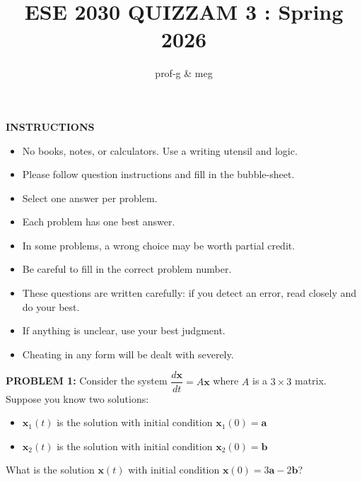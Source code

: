 \documentclass[12pt]{amsart}
\title{ESE 2030 QUIZZAM 3 : Spring 2026}
\author{prof-g \& meg}
\begin{document}
\maketitle

\begin{center}
    {\bf INSTRUCTIONS}
\end{center}

\begin{itemize}
\item 
No books, notes, or calculators. Use a writing utensil and logic. 

\item 
Please follow question instructions and fill in the bubble-sheet. 

\item 
Select one answer per problem.

\item 
Each problem has one best answer. 

\item 
In some problems, a wrong choice may be worth partial credit. 

\item 
Be careful to fill in the correct problem number. 

\item 
These questions are written carefully: if you detect an error, read closely and do your best.

\item 
If anything is unclear, use your best judgment. 

\item 
Cheating in any form will be dealt with severely. 
\end{itemize}

\newpage




{\bf PROBLEM 1:}
%
Consider the system $\dfrac{d\mathbf{x}}{dt} = A\mathbf{x}$ where $A$ is a 
$3 \times 3$ matrix. Suppose you know two solutions:
\begin{itemize}
\item $\mathbf{x}_1(t)$ is the solution with initial condition $\mathbf{x}_1(0) = \mathbf{a}$
\item $\mathbf{x}_2(t)$ is the solution with initial condition $\mathbf{x}_2(0) = \mathbf{b}$
\end{itemize}
%
What is the solution $\mathbf{x}(t)$ with initial condition $\mathbf{x}(0) = 3\mathbf{a} - 2\mathbf{b}$?
\end{document}
